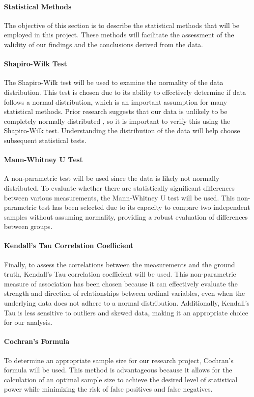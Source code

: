 \paragraph{Statistical Methods}
The objective of this section is to describe the statistical methods that will be employed in this project. These methods will facilitate the assessment of the validity of our findings and the conclusions derived from the data.

\paragraph{Shapiro-Wilk Test}
The Shapiro-Wilk test will be used to examine the normality of the data distribution. This test is chosen due to its ability to effectively determine if data follows a normal distribution, which is an important assumption for many statistical methods. Prior research suggests that our data is unlikely to be completely normally distributed \cite{biksbois}, so it is important to verify this using the Shapiro-Wilk test. Understanding the distribution of the data will help choose subsequent statistical tests.

\paragraph{Mann-Whitney U Test}
A non-parametric test will be used since the data is likely not normally distributed. To evaluate whether there are statistically significant differences between various measurements, the Mann-Whitney U test will be used. This non-parametric test has been selected due to its capacity to compare two independent samples without assuming normality, providing a robust evaluation of differences between groups.

\paragraph{Kendall's Tau Correlation Coefficient}
Finally, to assess the correlations between the measurements and the ground truth, Kendall's Tau correlation coefficient will be used. This non-parametric measure of association has been chosen because it can effectively evaluate the strength and direction of relationships between ordinal variables, even when the underlying data does not adhere to a normal distribution. Additionally, Kendall's Tau is less sensitive to outliers and skewed data, making it an appropriate choice for our analysis.

\paragraph{Cochran's Formula}
To determine an appropriate sample size for our research project, Cochran's formula will be used. This method is advantageous because it allows for the calculation of an optimal sample size to achieve the desired level of statistical power while minimizing the risk of false positives and false negatives.

